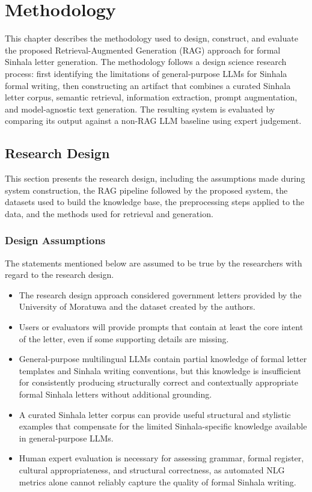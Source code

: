 \documentclass[12pt]{uomthesis}
\begin{document}
\chapter{Methodology}
This chapter describes the methodology used to design, construct, and evaluate the proposed Retrieval-Augmented Generation (RAG) approach for formal Sinhala letter generation. The methodology follows a design science research process: first identifying the limitations of general-purpose LLMs for Sinhala formal writing, then constructing an artifact that combines a curated Sinhala letter corpus, semantic retrieval, information extraction, prompt augmentation, and model-agnostic text generation. The resulting system is evaluated by comparing its output against a non-RAG LLM baseline using expert judgement.

\section{Research Design}
This section presents the research design, including the assumptions made during system construction, the RAG pipeline followed by the proposed system, the datasets used to build the knowledge base, the preprocessing steps applied to the data, and the methods used for retrieval and generation.

\subsection{Design Assumptions}
The statements mentioned below are assumed to be true by the researchers with regard to the research design.

\begin{itemize}
    \item The research design approach considered government letters provided by the University of Moratuwa and the dataset created by the authors.
    \item Users or evaluators will provide prompts that contain at least the core intent of the letter, even if some supporting details are missing.
    \item General-purpose multilingual LLMs contain partial knowledge of formal letter templates and Sinhala writing conventions, but this knowledge is insufficient for consistently producing structurally correct and contextually appropriate formal Sinhala letters without additional grounding.
    \item A curated Sinhala letter corpus can provide useful structural and stylistic examples that compensate for the limited Sinhala-specific knowledge available in general-purpose LLMs.
    \item Human expert evaluation is necessary for assessing grammar, formal register, cultural appropriateness, and structural correctness, as automated NLG metrics alone cannot reliably capture the quality of formal Sinhala writing.
\end{itemize}
\end{document}
